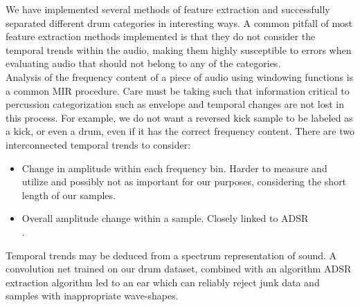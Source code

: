\documentclass{nime-alternate} %
\begin{document}
We have implemented several methods of feature extraction and successfully separated different drum categories in interesting ways. 
A common pitfall of most feature extraction methods implemented is that they do not consider the temporal trends within the audio, making them highly susceptible to errors when evaluating audio that should not belong to any of the categories.\\
Analysis of the frequency content of a piece of audio using windowing functions is a common MIR procedure. Care must be taking such that information critical to percussion categorization such as envelope and temporal changes are not lost in this process. For example, we do not want a reversed kick sample to be labeled as a kick, or even a drum, even if it has the correct frequency content. There are two interconnected temporal trends to consider: 
\begin{itemize}
    \item Change in amplitude within each frequency bin. Harder to measure and utilize and possibly not as important for our purposes, considering the short length of our samples.
    \item Overall amplitude change within a sample. Closely linked to ADSR\\. 
\end{itemize}{}
Temporal trends may be deduced from a spectrum representation of sound. A convolution net trained on our drum dataset, combined with an algorithm ADSR extraction algorithm led to an ear which can reliably reject junk data and samples with inappropriate wave-shapes. 
\end{document}
